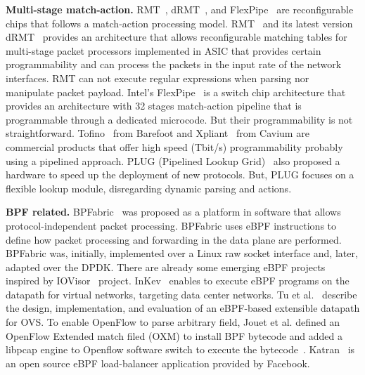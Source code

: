 \textbf{Multi-stage match-action.} RMT~\cite{bosshart2013forwarding}, dRMT~\cite{chole2017drmt}, and FlexPipe~\cite{FlexPipe2012} are reconfigurable chips that follows a match-action processing model.
RMT~\cite{bosshart2013forwarding} and its latest version dRMT~\cite{chole2017drmt} provides an architecture that allows reconfigurable matching tables for multi-stage packet processors implemented in ASIC that provides certain programmability and can process the packets in the input rate of the network interfaces. RMT can not execute regular expressions when parsing nor manipulate packet payload. Intel's FlexPipe~\cite{FlexPipe2012} is a switch chip architecture that provides an architecture with 32 stages match-action pipeline that is programmable through a dedicated microcode. But their programmability is not straightforward. Tofino~\cite{barefoot-tofino} from Barefoot and Xpliant~\cite{cavium1,cavium2} from Cavium are commercial products that offer high speed (Tbit/s) programmability probably using a pipelined approach.
PLUG (Pipelined Lookup Grid)~\cite{DeCarli:2009:PFL:1592568.1592593} also proposed a hardware to speed up the deployment of new protocols. But, PLUG focuses on a flexible lookup module, disregarding dynamic parsing and actions. 




\textbf{BPF related.} BPFabric~\cite{Jouet:2017:BPFabric} was proposed as a platform in software that allows protocol-independent packet processing. 
BPFabric uses eBPF instructions to define how packet processing and forwarding in the data plane are performed.
BPFabric was, initially, implemented over a Linux raw socket interface and, later, adapted over the DPDK.
There  are  already some emerging eBPF projects inspired by IOVisor~\cite{IOvisor} project.
InKev~\cite{InKeV2016} enables to execute eBPF programs on the datapath for virtual networks, targeting data center networks.
Tu et al.~\cite{Tu:2017:BEO:3139645.3139657} describe the design, implementation, and evaluation of an eBPF-based extensible datapath for OVS.
To enable OpenFlow to parse arbitrary field, Jouet et al. defined an OpenFlow Extended match filed (OXM) to install BPF bytecode and added a libpcap engine to Openflow software switch to execute the bytecode~\cite{Jouet2015OpenFlow}.
Katran~\cite{Katran2018} is an open source eBPF load-balancer application provided by Facebook.

